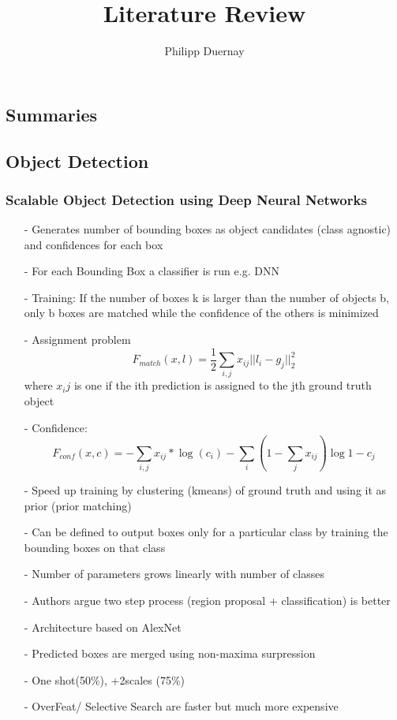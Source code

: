 \documentclass{article}
\begin{document}
	\title{Literature Review}
	\author{Philipp Duernay}
	\maketitle
	\begin{multicols}{2}
		
	\section{Summaries}
	\subsection{Object Detection}
		\subsubsection{Scalable Object Detection using Deep Neural Networks\cite{Erhan}}
		\begin{itemize}
			\item[-] Generates number of bounding boxes as object candidates (class agnostic) and confidences for each box
			\item[-] For each Bounding Box a classifier is run e.g. DNN
			\item[-] Training: If the number of boxes k is larger than the number of objects b, only b boxes are matched while the confidence of the others is minimized
			\item[-] Assignment problem $$F_{match}(x,l) = \frac{1}{2}\sum_{i,j}x_{ij}||l_i - g_j||^2_2$$ where $x_ij$ is one if the ith prediction is assigned to the jth ground truth object
			\item[-] Confidence: 
			$$F_{conf}(x,c) = - \sum_{i,j}x_{ij}*\log(c_i)-\sum_{i}(1-\sum_{j}x_{ij})\log{1-c_j}$$
			\item[-] Speed up training by clustering (kmeans) of ground truth and using it as prior (prior matching)
			\item[-] Can be defined to output boxes only for a particular class by training the bounding boxes on that class
			\item[-] Number of parameters grows linearly with number of classes
			\item[-] Authors argue two step process (region proposal + classification) is better
			\item[-] Architecture based on AlexNet
			\item[-] Predicted boxes are merged using non-maxima surpression
			\item[-] One shot(50\%), +2scales (75\%)
			\item[-] OverFeat/ Selective Search are faster but much more expensive
		\end{itemize}

\end{multicols}
\end{document}
